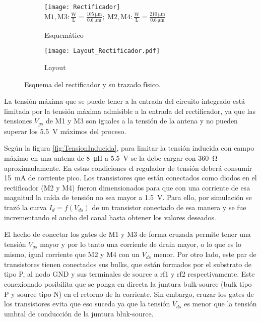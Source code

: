 \begin{figure}
	\centering
	\begin{subfigure}[b]{0.45\textwidth}
		\centering
		\texttt{[image: Rectificador]}
		\(\scriptstyle\mathrm{M1,M3: \frac{W}{L}}= 
		\frac{\SI{105}{\micro\meter}}{\SI{0.6}{\micro\meter}};\;
		\mathrm{M2,M4: 
		\frac{W}{L}}=\frac{\SI{210}{\micro\meter}}{\SI{0.6}{\micro\meter}}\)
		\caption{Esquemático}
		\label{fig:Rectificador}
	\end{subfigure}
	\quad
	\begin{subfigure}[b]{0.45\textwidth}
	    \centering
		\texttt{[image: Layout\_Rectificador.pdf]}
		\caption{Layout}
		\label{fig:LayoutRectificador}
	\end{subfigure}
	\caption{Esquema del rectificador y su trazado físico.}
	\label{fig:RectificadorYLayout}
\end{figure}

La tensión máxima que se puede tener a la entrada del circuito 
integrado está limitada por la tensión máxima admisible a la entrada 
del rectificador, ya que las tensiones \(V_{gs}\) de M1 y M3 son 
iguales a la tensión de la antena y no pueden superar los 
\SI{5.5}{\volt} máximos del proceso.

Según la figura \ref{fig:TensionInducida}, para limitar la tensión 
inducida con campo máximo en una antena de \SI{8}{\micro\henry} a 
\SI{5.5}{\volt} se la debe cargar con \SI{360}{\ohm} aproximadamente. 
En estas condiciones el regulador de tensión deberá consumir 
\SI{15}{\milli\ampere} de corriente pico. Los transistores que están 
conectados como diodos en el rectificador (M2 y M4) fueron 
dimensionados para que con una corriente de esa magnitud la caída de 
tensión no sea mayor a \SI{1.5}{\volt}. Para ello, por simulación se 
trazó la curva \(I_{d}=f(V_{ds})\) de un transistor conectado de esa 
manera y se fue incrementando el ancho del canal hasta obtener los 
valores deseados.

El hecho de conectar los gates de M1 y M3 de forma cruzada permite 
tener una tensión \(V_{gs}\) mayor y por lo tanto una corriente de 
drain mayor, o lo que es lo mismo, igual corriente que M2 y M4 con 
un \(V_{ds}\) menor. Por otro lado, este par de transistores tienen 
conectados sus bulks, que están formados por el substrato de tipo P, 
al nodo GND y sus terminales de source a rf1 y rf2 respectivamente. 
Este conexionado posibilita que se ponga en directa la juntura 
bulk-source (bulk tipo P y source tipo N) en el retorno de la 
corriente. Sin embargo, cruzar los gates de los transistores evita 
que eso suceda ya que la tensión \( V_{ds}\) es menor que la tensión 
umbral de conducción de la juntura bluk-source.

